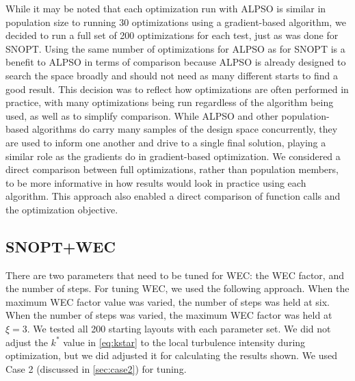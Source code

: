 \documentclass[hidelinks,sort&compress,AMA,STIX1COL]{WileyNJD-v2}
\begin{document}
While it may be noted that each optimization run with ALPSO is similar in population size to running 30 optimizations using a gradient-based algorithm, we decided to run a full set of 200 optimizations for each test, just as was done for SNOPT. Using the same number of optimizations for ALPSO as for SNOPT is a benefit to ALPSO in terms of comparison because ALPSO is already designed to search the space broadly and should not need as many different starts to find a good result. This decision was to reflect how optimizations are often performed in practice, with many optimizations being run regardless of the algorithm being used, as well as to simplify comparison. While ALPSO and other population-based algorithms do carry many samples of the design space concurrently, they are used to inform one another and drive to a single final solution, playing a similar role as the gradients do in gradient-based optimization. We considered a direct comparison between full optimizations, rather than population members, to be more informative in how results would look in practice using each algorithm. This approach also enabled a direct comparison of function calls and the optimization objective.

\subsection{SNOPT+WEC}\label{sec:bpa_wec_comparison}

There are two parameters that need to be tuned for WEC: the WEC factor, and the number of steps. For tuning WEC, we used the following approach. When the maximum WEC factor value was varied, the number of steps was held at six. When the number of steps was varied, the maximum WEC factor was held at $\xi=3$. We tested all 200 starting layouts with each parameter set. We did not adjust the $k^*$ value in \cref{eq:kstar} to the local turbulence intensity during optimization, but we did  adjusted it for calculating the results shown. We used Case 2 (discussed in \cref{sec:case2}) for tuning. 
\end{document}
